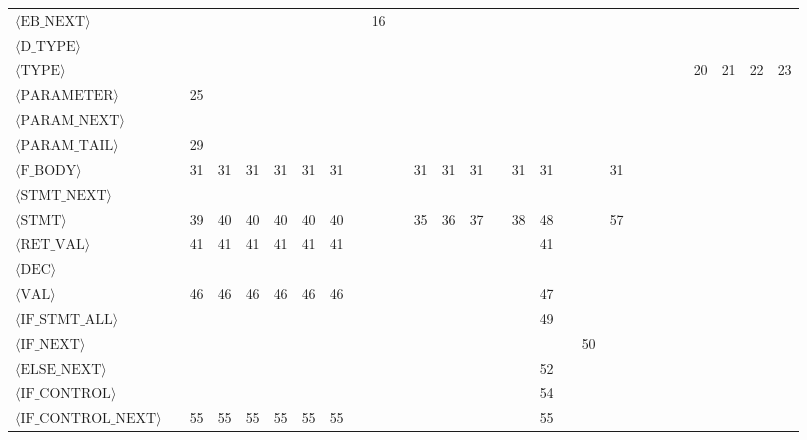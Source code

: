 \begin{center}
\begin{tabular}{l|ccccccccccccccccccccccccccc}
$\langle\text{EB\_NEXT}\rangle$ &  &  &  &  &  &  &  &  & 16 &  &  &  &  &  &  &  &  &  &  &  &  &  &  &  &  &  &  \\
$\langle\text{D\_TYPE}\rangle$ &  &  &  &  &  &  &  &  &  &  &  &  &  &  &  &  &  &  &  &  &  &  &  &  &  &  &  \\
$\langle\text{TYPE}\rangle$ &  &  &  &  &  &  &  &  &  &  &  &  &  &  &  &  &  &  &  &  &  &  &  & 20 & 21 & 22 & 23 \\
$\langle\text{PARAMETER}\rangle$ &  & 25 &  &  &  &  &  &  &  &  &  &  &  &  &  &  &  &  &  &  &  &  &  &  &  &  &  \\
$\langle\text{PARAM\_NEXT}\rangle$ &  &  &  &  &  &  &  &  &  &  &  &  &  &  &  &  &  &  &  &  &  &  &  &  &  &  &  \\
$\langle\text{PARAM\_TAIL}\rangle$ &  & 29 &  &  &  &  &  &  &  &  &  &  &  &  &  &  &  &  &  &  &  &  &  &  &  &  &  \\
$\langle\text{F\_BODY}\rangle$ &  & 31 & 31 & 31 & 31 & 31 & 31 &  &  &  & 31 & 31 & 31 &  & 31 & 31 &  &  & 31 &  &  &  &  &  &  &  &  \\
$\langle\text{STMT\_NEXT}\rangle$ &  &  &  &  &  &  &  &  &  &  &  &  &  &  &  &  &  &  &  &  &  &  &  &  &  &  &  \\
$\langle\text{STMT}\rangle$ &  & 39 & 40 & 40 & 40 & 40 & 40 &  &  &  & 35 & 36 & 37 &  & 38 & 48 &  &  & 57 &  &  &  &  &  &  &  &  \\
$\langle\text{RET\_VAL}\rangle$ &  & 41 & 41 & 41 & 41 & 41 & 41 &  &  &  &  &  &  &  &  & 41 &  &  &  &  &  &  &  &  &  &  &  \\
$\langle\text{DEC}\rangle$ &  &  &  &  &  &  &  &  &  &  &  &  &  &  &  &  &  &  &  &  &  &  &  &  &  &  &  \\
$\langle\text{VAL}\rangle$ &  & 46 & 46 & 46 & 46 & 46 & 46 &  &  &  &  &  &  &  &  & 47 &  &  &  &  &  &  &  &  &  &  &  \\
$\langle\text{IF\_STMT\_ALL}\rangle$ &  &  &  &  &  &  &  &  &  &  &  &  &  &  &  & 49 &  &  &  &  &  &  &  &  &  &  &  \\
$\langle\text{IF\_NEXT}\rangle$ &  &  &  &  &  &  &  &  &  &  &  &  &  &  &  &  &  & 50 &  &  &  &  &  &  &  &  &  \\
$\langle\text{ELSE\_NEXT}\rangle$ &  &  &  &  &  &  &  &  &  &  &  &  &  &  &  & 52 &  &  &  &  &  &  &  &  &  &  &  \\
$\langle\text{IF\_CONTROL}\rangle$ &  &  &  &  &  &  &  &  &  &  &  &  &  &  &  & 54 &  &  &  &  &  &  &  &  &  &  &  \\
$\langle\text{IF\_CONTROL\_NEXT}\rangle$ &  & 55 & 55 & 55 & 55 & 55 & 55 &  &  &  &  &  &  &  &  & 55 &  &  &  &  &  &  &  &  &  &  &  \\

\end{tabular}
\end{center}

